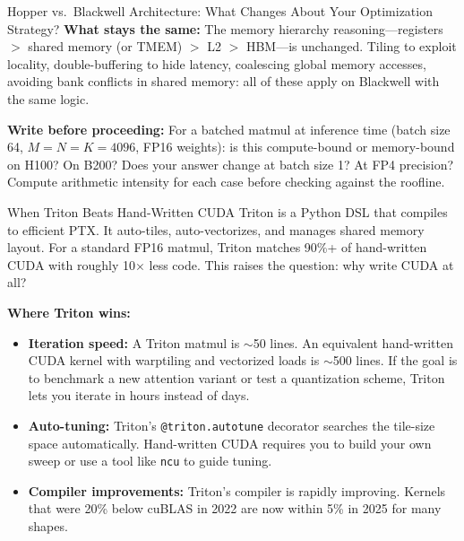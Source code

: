 \begin{thinkfirst}{Hopper vs.\ Blackwell Architecture: What Changes About Your Optimization Strategy?}
\textbf{What stays the same:} The memory hierarchy reasoning---registers $>$ shared memory (or TMEM) $>$ L2 $>$ HBM---is unchanged. Tiling to exploit locality, double-buffering to hide latency, coalescing global memory accesses, avoiding bank conflicts in shared memory: all of these apply on Blackwell with the same logic.

\textbf{Write before proceeding:} For a batched matmul at inference time (batch size 64, $M=N=K=4096$, FP16 weights): is this compute-bound or memory-bound on H100? On B200? Does your answer change at batch size 1? At FP4 precision? Compute arithmetic intensity for each case before checking against the roofline.
\end{thinkfirst}

\begin{thinkfirst}{When Triton Beats Hand-Written CUDA}
Triton is a Python DSL that compiles to efficient PTX. It auto-tiles, auto-vectorizes, and manages shared memory layout. For a standard FP16 matmul, Triton matches 90\%+ of hand-written CUDA with roughly 10$\times$ less code. This raises the question: why write CUDA at all?

\textbf{Where Triton wins:}
\begin{itemize}
  \item \textbf{Iteration speed:} A Triton matmul is $\sim$50 lines. An equivalent hand-written CUDA kernel with warptiling and vectorized loads is $\sim$500 lines. If the goal is to benchmark a new attention variant or test a quantization scheme, Triton lets you iterate in hours instead of days.
  \item \textbf{Auto-tuning:} Triton's \texttt{@triton.autotune} decorator searches the tile-size space automatically. Hand-written CUDA requires you to build your own sweep or use a tool like \texttt{ncu} to guide tuning.
  \item \textbf{Compiler improvements:} Triton's compiler is rapidly improving. Kernels that were 20\% below cuBLAS in 2022 are now within 5\% in 2025 for many shapes.
\end{itemize}


\end{thinkfirst}

